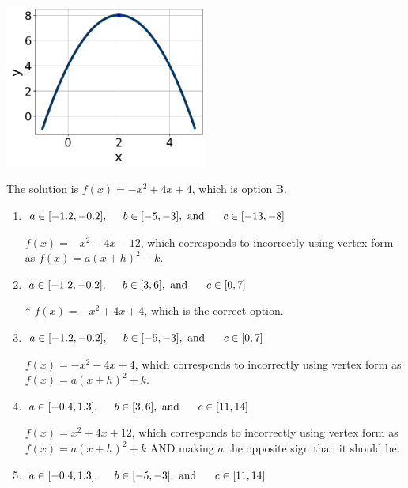 \documentclass{extbook}[14pt]
\begin{document}
\begin{enumerate}
{\begin{center}
    \includegraphics[width=0.5\textwidth]{../Figures/quadraticGraphToEquationCopyA.png}
\end{center}


The solution is \( f(x) = -x^{2} +4 x + 4 \), which is option B.\begin{enumerate}[label=\Alph*.]
\item \( a \in [-1.2, -0.2], \hspace*{5mm} b \in [-5, -3], \text{ and } \hspace*{5mm} c \in [-13, -8] \)

$f(x)=-x^{2} -4 x -12$, which corresponds to incorrectly using vertex form as $f(x) = a(x+h)^2 - k$.
\item \( a \in [-1.2, -0.2], \hspace*{5mm} b \in [3, 6], \text{ and } \hspace*{5mm} c \in [0, 7] \)

* $f(x)=-x^{2} +4 x + 4$, which is the correct option.
\item \( a \in [-1.2, -0.2], \hspace*{5mm} b \in [-5, -3], \text{ and } \hspace*{5mm} c \in [0, 7] \)

$f(x)=-x^{2} -4 x + 4$, which corresponds to incorrectly using vertex form as $f(x) = a(x+h)^2+k$.
\item \( a \in [-0.4, 1.3], \hspace*{5mm} b \in [3, 6], \text{ and } \hspace*{5mm} c \in [11, 14] \)

$f(x)=x^{2} +4 x + 12$, which corresponds to incorrectly using vertex form as $f(x) = a(x+h)^2+k$ AND making $a$ the opposite sign than it should be.
\item \( a \in [-0.4, 1.3], \hspace*{5mm} b \in [-5, -3], \text{ and } \hspace*{5mm} c \in [11, 14] \)


\end{enumerate}}
\end{enumerate}
\end{document}
